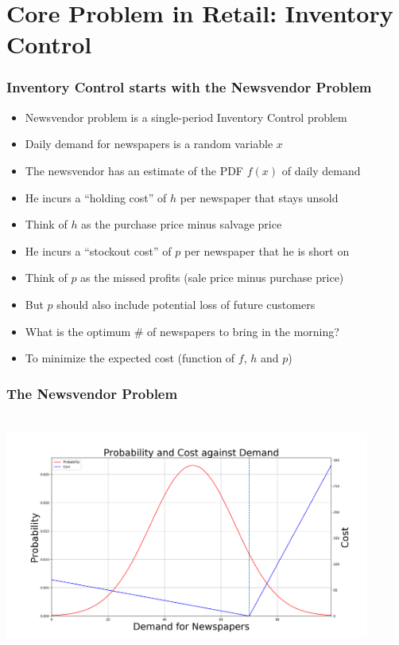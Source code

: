 \documentclass[handout]{beamer}
\begin{document}
\section{Core Problem in Retail: Inventory Control}

\begin{frame}
\frametitle{Inventory Control starts with the Newsvendor Problem}
\pause
\begin{itemize}[<+->]
\item Newsvendor problem is a single-period Inventory Control problem
\item Daily demand for newspapers is a random variable $x$
\item The newsvendor has an estimate of the PDF $f(x)$ of daily demand
\item He incurs a ``holding cost'' of $h$ per newspaper that stays unsold
\item Think of $h$ as the purchase price minus salvage price
\item He incurs a ``stockout cost'' of $p$ per newspaper that he is short on
\item Think of $p$ as the missed profits (sale price minus purchase price)
\item But $p$ should also include potential loss of future customers
\item What is the optimum \# of newspapers to bring in the morning?
\item To minimize the expected cost (function of $f$, $h$ and $p$)
\end{itemize}
\end{frame}

\begin{frame}
\frametitle{The Newsvendor Problem}
\includegraphics[width=12cm, height=8cm]{newsvendor.png}
\end{frame}
\end{document}
